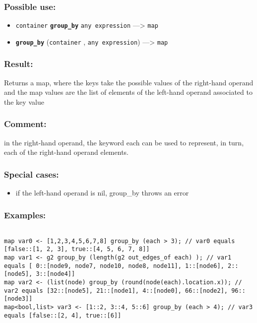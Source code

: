 \documentclass[]{book}
\providecommand{\tightlist}{%
  \setlength{\itemsep}{0pt}\setlength{\parskip}{0pt}}
\theoremstyle{definition}
\theoremstyle{definition}
\theoremstyle{definition}
\theoremstyle{remark}
\begin{document}
\subsubsection{Possible use:}\label{possible-use-244}

\begin{itemize}
\tightlist
\item
  \texttt{container} \textbf{\texttt{group\_by}}
  \texttt{any\ expression} ---\textgreater{} \texttt{map}
\item
  \textbf{\texttt{group\_by}} (\texttt{container} ,
  \texttt{any\ expression}) ---\textgreater{} \texttt{map}
\end{itemize}

\subsubsection{Result:}\label{result-235}

Returns a map, where the keys take the possible values of the right-hand
operand and the map values are the list of elements of the left-hand
operand associated to the key value

\subsubsection{Comment:}\label{comment-46}

in the right-hand operand, the keyword each can be used to represent, in
turn, each of the right-hand operand elements.

\subsubsection{Special cases:}\label{special-cases-74}

\begin{itemize}
\tightlist
\item
  if the left-hand operand is nil, group\_by throws an error
\end{itemize}

\subsubsection{Examples:}\label{examples-184}

\begin{verbatim}
 
map var0 <- [1,2,3,4,5,6,7,8] group_by (each > 3); // var0 equals [false::[1, 2, 3], true::[4, 5, 6, 7, 8]] 
map var1 <- g2 group_by (length(g2 out_edges_of each) ); // var1 equals [ 0::[node9, node7, node10, node8, node11], 1::[node6], 2::[node5], 3::[node4]] 
map var2 <- (list(node) group_by (round(node(each).location.x)); // var2 equals [32::[node5], 21::[node1], 4::[node0], 66::[node2], 96::[node3]] 
map<bool,list> var3 <- [1::2, 3::4, 5::6] group_by (each > 4); // var3 equals [false::[2, 4], true::[6]]
\end{verbatim}
\end{document}
